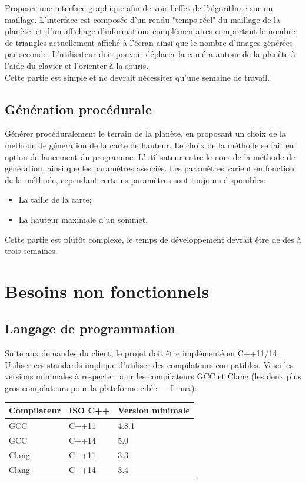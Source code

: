 Proposer une interface graphique afin de voir l'effet de l'algorithme
sur un maillage. L'interface est composée d'un rendu "temps réel" du
maillage de la planète, et d'un affichage d'informations complémentaires
comportant le nombre de triangles actuellement affiché à l'écran ainsi
que le nombre d'images générées par seconde. L'utilisateur doit pouvoir
déplacer la caméra autour de la planète à l'aide du clavier et
l'orienter à la souris.\\

Cette partie est simple et ne devrait nécessiter qu'une semaine de travail.

\subsection{Génération procédurale}\label{generation-procedurale}

Générer procéduralement le terrain de la planète, en proposant un choix
de la méthode de génération de la carte de hauteur. Le choix de la
méthode se fait en option de lancement du programme. L'utilisateur entre le nom de la méthode de génération, ainsi que les paramètres associés. Les paramètres varient en fonction de la méthode, cependant certains paramètres sont toujours disponibles:
\begin{itemize}
    \item La taille de la carte;
    \item La hauteur maximale d'un sommet.
\end{itemize}

Cette partie est plutôt complexe, le temps de développement devrait être de des à trois semaines.

\section{Besoins non fonctionnels}\label{besoins-non-fonctionnels}

\subsection{Langage de programmation}

Suite aux demandes du client, le projet doit être implémenté en C++11/14
. Utiliser ces standards implique d'utiliser des compilateurs
compatibles. Voici les versions minimales à respecter pour les
compilateurs GCC et Clang (les deux plus gros compilateurs pour la
plateforme cible --- Linux):

\begin{longtable}[]{@{}lll@{}}
\toprule
Compilateur & ISO C++ & Version minimale\tabularnewline
\midrule
\endhead
GCC & C++11 & 4.8.1\tabularnewline
GCC & C++14 & 5.0\tabularnewline
Clang & C++11 & 3.3\tabularnewline
Clang & C++14 & 3.4\tabularnewline
\bottomrule
\end{longtable}

